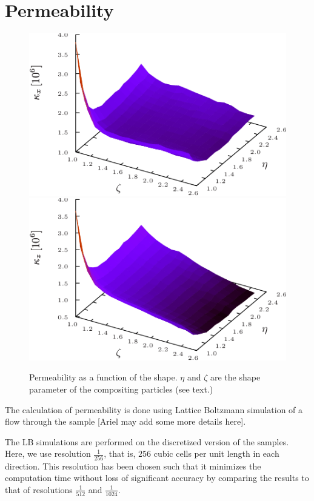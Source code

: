 \documentclass[aps,twocolumn,superscriptaddress,showpacs,showkeys]{revtex4-1}
\begin{document}
\section{Permeability}
\label{sec:permeability}
\begin{figure}
\begin{center}
\includegraphics*[width=1.0\columnwidth]{data-figs/permeability_x}
\includegraphics*[width=1.0\columnwidth]{data-figs/permeability_z}
\caption{\protect
	Permeability as a function of the shape. $\eta$ and $\zeta$ 
	are the shape parameter of the compositing particles (see text.)
	}
\label{fig:perm}
\end{center}
\end{figure}

The calculation of permeability is done using Lattice Boltzmann simulation of
a flow through the sample [Ariel may add some more details here].

The LB simulations are performed on the discretized version of the
samples. Here, we use resolution $\frac{1}{256}$, that is, $256$ cubic cells
per unit length in each direction.  This resolution has been chosen such that
it minimizes the computation time without loss of significant accuracy by
comparing the results to that of resolutions $\frac{1}{512}$ and
$\frac{1}{1024}$.
\end{document}
